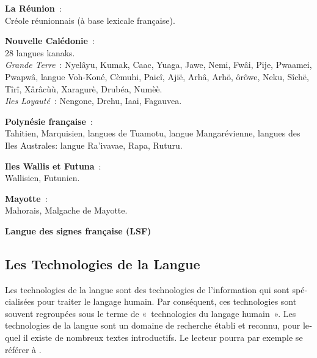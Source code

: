 \begin{french}
\begin{multicols}{2}
{\bf La Réunion}~:\\
Créole réunionnais (à base lexicale française).

{\bf Nouvelle Calédonie}~:\\
28 langues kanaks.\\
{\em Grande Terre}~: Nyelâyu, Kumak, Caac, Yuaga, Jawe, Nemi, Fwâi, Pije, Pwaamei, Pwapwâ, langue Voh-Koné, Cèmuhi, Paicî, Ajië, Arhâ, Arhö, ôrôwe, Neku, Sîchë, Tîrî, Xârâcùù, Xaragurè, Drubéa, Numèè. \\
{\em Iles Loyauté}~: Nengone, Drehu, Iaai, Fagauvea.

{\bf Polynésie française}~:\\
Tahitien, Marquisien, langues de Tuamotu, langue Mangarévienne, langues des Iles Australes: langue Ra'ivavae, Rapa, Ruturu.

{\bf Iles Wallis et Futuna}~:\\
Wallisien, Futunien.

{\bf Mayotte}~:\\
Mahorais, Malgache de Mayotte.

{\bf Langue des signes française (LSF)}\\

\end{multicols}

\clearpage


\begin{multicols}{2}

\subsection{Les Technologies de la Langue}

Les technologies de la langue sont des technologies de l'information
qui sont spécialisées pour traiter le langage humain. Par conséquent,
ces technologies sont souvent regroupées sous le terme de «~technologies
du langage humain~». Les technologies de la langue sont un domaine de recherche \'etabli et reconnu, pour lequel il existe de nombreux textes introductifs. Le lecteur pourra par exemple se r\'ef\'erer \`a \cite{hltsurvey96} \cite{varile1997survey}.


\end{multicols}
\end{french}
